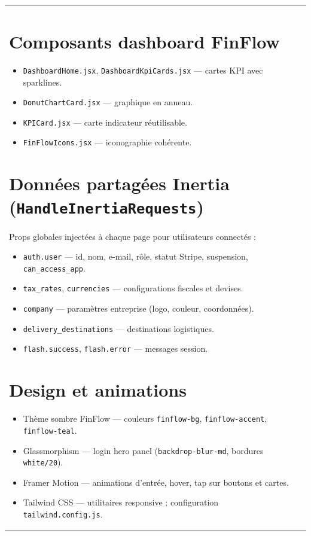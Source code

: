 \documentclass[11pt,a4paper]{report}
\begin{document}
\begin{longtable}{@{}p{3.5cm}p{10.2cm}@{}}
\section{Composants dashboard FinFlow}

\begin{itemize}[leftmargin=*]
    \item \texttt{DashboardHome.jsx}, \texttt{DashboardKpiCards.jsx} — cartes KPI avec sparklines.
    \item \texttt{DonutChartCard.jsx} — graphique en anneau.
    \item \texttt{KPICard.jsx} — carte indicateur réutilisable.
    \item \texttt{FinFlowIcons.jsx} — iconographie cohérente.
\end{itemize}

\section{Données partagées Inertia (\texttt{HandleInertiaRequests})}

Props globales injectées à chaque page pour utilisateurs connectés :
\begin{itemize}[leftmargin=*]
    \item \texttt{auth.user} — id, nom, e-mail, rôle, statut Stripe, suspension, \texttt{can\_access\_app}.
    \item \texttt{tax\_rates}, \texttt{currencies} — configurations fiscales et devises.
    \item \texttt{company} — paramètres entreprise (logo, couleur, coordonnées).
    \item \texttt{delivery\_destinations} — destinations logistiques.
    \item \texttt{flash.success}, \texttt{flash.error} — messages session.
\end{itemize}

\section{Design et animations}

\begin{itemize}[leftmargin=*]
    \item Thème sombre FinFlow — couleurs \texttt{finflow-bg}, \texttt{finflow-accent}, \texttt{finflow-teal}.
    \item Glassmorphism — login hero panel (\texttt{backdrop-blur-md}, bordures \texttt{white/20}).
    \item Framer Motion — animations d'entrée, hover, tap sur boutons et cartes.
    \item Tailwind CSS — utilitaires responsive ; configuration \texttt{tailwind.config.js}.
\end{itemize}


\end{longtable}
\end{document}
